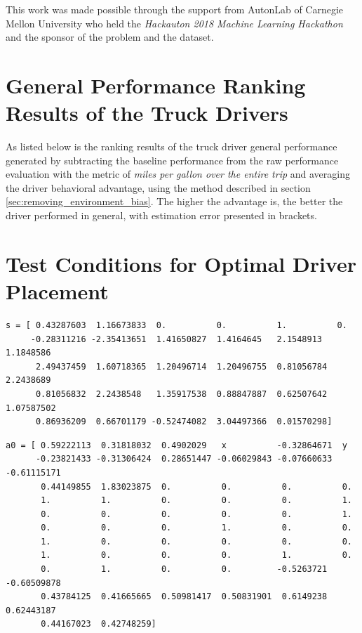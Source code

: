 \documentclass{article}
\begin{document}
This work was made possible through the support from AutonLab of Carnegie Mellon University who held the \textit{Hackauton 2018 Machine Learning Hackathon} and the sponsor of the problem and the dataset.






\newpage


\begin{appendices}

\section{General Performance Ranking Results of the Truck Drivers}\label{sec:appendix_truck_driver_rankings}

As listed below is the ranking results of the truck driver general performance generated by subtracting the baseline performance from the raw performance evaluation with the metric of \textit{miles per gallon over the entire trip} and averaging the driver behavioral advantage, using the method described in section \ref{sec:removing_environment_bias}. The higher the advantage is, the better the driver performed in general, with estimation error presented in brackets.

\begin{multicols}{3}
\end{multicols}

\newpage

\section{Test Conditions for Optimal Driver Placement}\label{sec:appendix_test_conditions}

\begin{Verbatim}[fontsize=\small]
s = [ 0.43287603  1.16673833  0.          0.          1.          0.
     -0.28311216 -2.35413651  1.41650827  1.4164645   2.1548913   1.1848586
      2.49437459  1.60718365  1.20496714  1.20496755  0.81056784  2.2438689
      0.81056832  2.2438548   1.35917538  0.88847887  0.62507642  1.07587502
      0.86936209  0.66701179 -0.52474082  3.04497366  0.01570298]
\end{Verbatim}

\begin{Verbatim}[fontsize=\small]
a0 = [ 0.59222113  0.31818032  0.4902029   x          -0.32864671  y
      -0.23821433 -0.31306424  0.28651447 -0.06029843 -0.07660633 -0.61115171
       0.44149855  1.83023875  0.          0.          0.          0.
       1.          1.          0.          0.          0.          1.
       0.          0.          0.          0.          0.          1.
       0.          0.          0.          1.          0.          0.
       1.          0.          0.          0.          0.          0.
       1.          0.          0.          0.          1.          0.
       0.          1.          0.          0.         -0.5263721  -0.60509878
       0.43784125  0.41665665  0.50981417  0.50831901  0.6149238   0.62443187
       0.44167023  0.42748259]
\end{Verbatim}


\end{appendices}
\end{document}
